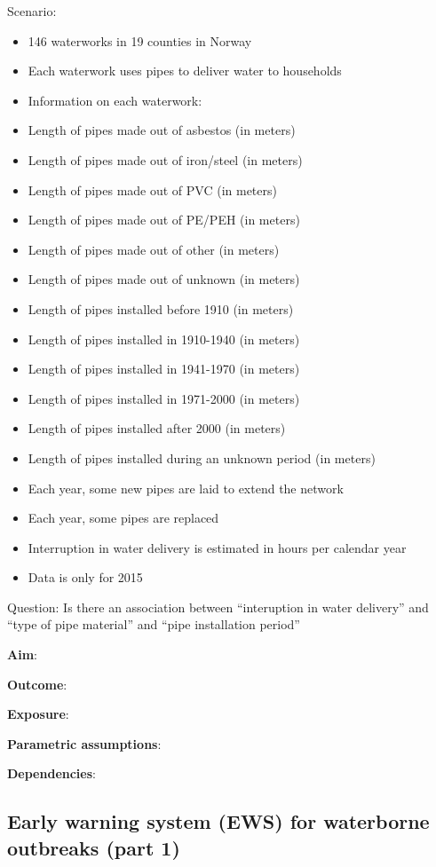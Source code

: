 \documentclass[12pt,]{article}
\providecommand{\tightlist}{%
  \setlength{\itemsep}{0pt}\setlength{\parskip}{0pt}}
\begin{document}
Scenario:

\begin{itemize}
\tightlist
\item
  146 waterworks in 19 counties in Norway
\item
  Each waterwork uses pipes to deliver water to households
\item
  Information on each waterwork:
\item
  Length of pipes made out of asbestos (in meters)
\item
  Length of pipes made out of iron/steel (in meters)
\item
  Length of pipes made out of PVC (in meters)
\item
  Length of pipes made out of PE/PEH (in meters)
\item
  Length of pipes made out of other (in meters)
\item
  Length of pipes made out of unknown (in meters)
\item
  Length of pipes installed before 1910 (in meters)
\item
  Length of pipes installed in 1910-1940 (in meters)
\item
  Length of pipes installed in 1941-1970 (in meters)
\item
  Length of pipes installed in 1971-2000 (in meters)
\item
  Length of pipes installed after 2000 (in meters)
\item
  Length of pipes installed during an unknown period (in meters)
\item
  Each year, some new pipes are laid to extend the network
\item
  Each year, some pipes are replaced
\item
  Interruption in water delivery is estimated in hours per calendar year
\item
  Data is only for 2015
\end{itemize}

Question: Is there an association between ``interuption in water
delivery'' and ``type of pipe material'' and ``pipe installation
period''

\textbf{Aim}:

\textbf{Outcome}:

\textbf{Exposure}:

\textbf{Parametric assumptions}:

\textbf{Dependencies}:

\subsection{Early warning system (EWS) for waterborne outbreaks (part
1)}\label{early-warning-system-ews-for-waterborne-outbreaks-part-1}
\end{document}
